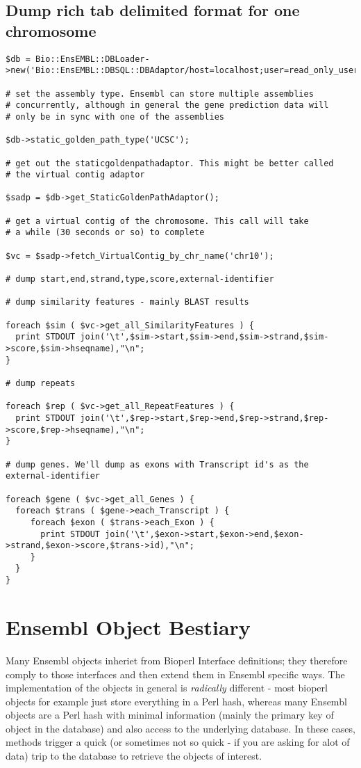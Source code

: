 \documentclass[11pt,a4paper]{article}
\begin{document}
\subsection{Dump rich tab delimited format for one chromosome}

\begin{verbatim}
$db = Bio::EnsEMBL::DBLoader->new('Bio::EnsEMBL::DBSQL::DBAdaptor/host=localhost;user=read_only_user;dbname=test_ensembl');

# set the assembly type. Ensembl can store multiple assemblies
# concurrently, although in general the gene prediction data will
# only be in sync with one of the assemblies

$db->static_golden_path_type('UCSC');

# get out the staticgoldenpathadaptor. This might be better called
# the virtual contig adaptor

$sadp = $db->get_StaticGoldenPathAdaptor();

# get a virtual contig of the chromosome. This call will take
# a while (30 seconds or so) to complete

$vc = $sadp->fetch_VirtualContig_by_chr_name('chr10');

# dump start,end,strand,type,score,external-identifier

# dump similarity features - mainly BLAST results

foreach $sim ( $vc->get_all_SimilarityFeatures ) {
  print STDOUT join('\t',$sim->start,$sim->end,$sim->strand,$sim->score,$sim->hseqname),"\n";
}

# dump repeats

foreach $rep ( $vc->get_all_RepeatFeatures ) {
  print STDOUT join('\t',$rep->start,$rep->end,$rep->strand,$rep->score,$rep->hseqname),"\n";
}

# dump genes. We'll dump as exons with Transcript id's as the external-identifier

foreach $gene ( $vc->get_all_Genes ) {
  foreach $trans ( $gene->each_Transcript ) {
     foreach $exon ( $trans->each_Exon ) {
       print STDOUT join('\t',$exon->start,$exon->end,$exon->strand,$exon->score,$trans->id),"\n";
     }
  }
}

\end{verbatim}

\section{Ensembl Object Bestiary}

Many Ensembl objects inheriet from Bioperl Interface definitions; they
therefore comply to those interfaces and then extend them in Ensembl
specific ways. The implementation of the objects in general is
\emph{radically} different - most bioperl objects for example just
store everything in a Perl hash, whereas many Ensembl objects are a
Perl hash with minimal information (mainly the primary key of object
in the database) and also access to the underlying database. In these
cases, methods trigger a quick (or sometimes not so quick - if you are
asking for alot of data) trip to the database to retrieve the objects
of interest.
\end{document}
